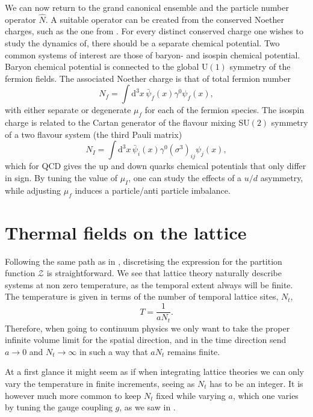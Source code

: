 We can now return to the grand canonical ensemble and the particle number
operator $\hat{N}$. A suitable operator can be created from the conserved
Noether charges, such as the one from . For every
distinct conserved charge one wishes to study the dynamics of, there should be a
separate chemical potential. Two common systems of interest are those of baryon-
and isospin chemical potential. Baryon chemical potential is connected to the
global U$(1)$ symmetry of the fermion fields. The associated Noether charge is
that of total fermion number
%
\begin{equation}
  N_f = \int \mathrm{d}^3 x \, \bar{\psi}_f(x) \gamma^0 \psi_f(x),
\end{equation}
%
with either separate or degenerate $\mu_f$ for each of the fermion species. The
isospin charge is related to the Cartan generator of the flavour mixing SU$(2)$
symmetry of a two flavour system (the third Pauli matrix)
%
\begin{equation}
  N_I  = \int \mathrm{d}^3 x \, \bar{\psi}_i(x) \gamma^0 (\sigma^3)_{ij}
    \psi_j(x),
\end{equation}
%
which for QCD gives the up and down quarks chemical potentials that only differ
in sign. By tuning the value of $\mu_I$, one can study the effects of a $u/d$
asymmetry, while adjusting $\mu_f$ induces a particle/anti particle imbalance.

\section{Thermal fields on the lattice} \label{sec-thermal-lattice-theory}

Following the same path as in , discretising the
expression for the partition function $\mathcal{Z}$ is straightforward. We see
that lattice theory naturally describe systems at non zero temperature, as the
temporal extent always will be finite. The temperature is given in terms of the
number of temporal lattice sites, $N_t$,
%
\begin{equation}
  T = \frac{1}{a N_t}.
\end{equation}
%
Therefore, when going to continuum physics we only want to take the proper
infinite volume limit for the spatial direction, and in the time direction send
$a\to0$ and $N_t\to\infty$ in such a way that $a N_t$ remains finite.

At a first glance it might seem as if when integrating lattice theories we can
only vary the temperature in finite increments, seeing as $N_t$ has to be an integer.
It is however much more common to keep $N_t$ fixed while varying $a$, which one
varies by tuning the gauge coupling $g$, as we saw in .

